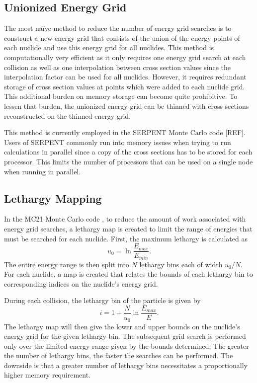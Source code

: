 \subsection{Unionized Energy Grid}

The most na\"{i}ve method to reduce the number of energy grid searches is to
construct a new energy grid that consists of the union of the energy points of
each nuclide and use this energy grid for all nuclides. This method is
computationally very efficient as it only requires one energy grid search at
each collision as well as one interpolation between cross section values since
the interpolation factor can be used for all nuclides. However, it requires
redundant storage of cross section values at points which were added to each
nuclide grid. This additional burden on memory storage can become quite
prohibitive. To lessen that burden, the unionized energy grid can be thinned
with cross sections reconstructed on the thinned energy grid.

This method is currently employed in the SERPENT Monte Carlo code [REF]. Users
of SERPENT commonly run into memory issues when trying to run calculations in
parallel since a copy of the cross sections has to be stored for each
processor. This limits the number of processors that can be used on a single
node when running in parallel.

\subsection{Lethargy Mapping}

In the MC21 Monte Carlo code \cite{mc21}, to reduce the amount of work
associated with energy grid searches, a lethargy map is created to limit the
range of energies that must be searched for each nuclide. First, the maximum
lethargy is calculated as
\begin{equation}\label{eq:max-lethargy}
  u_0 = \ln\frac{E_{max}}{E_{min}}.
\end{equation}
The entire energy range is then split into $N$ lethargy bins each of width
$u_0/N$. For each nuclide, a map is created that relates the bounds of each
lethargy bin to corresponding indices on the nuclide's energy grid.

During each collision, the lethargy bin of the particle is given by
\begin{equation}\label{eq:lethargy-bin}
  i = 1 + \frac{N}{u_0}\ln\frac{E_{max}}{E}.
\end{equation}
The lethargy map will then give the lower and upper bounds on the nuclide's
energy grid for the given lethargy bin. The subsequent grid search is performed
only over the limited energy range given by the bounds determined. The greater
the number of lethargy bins, the faster the searches can be performed. The
downside is that a greater number of lethargy bins necessitates a proportionally
higher memory requirement.

